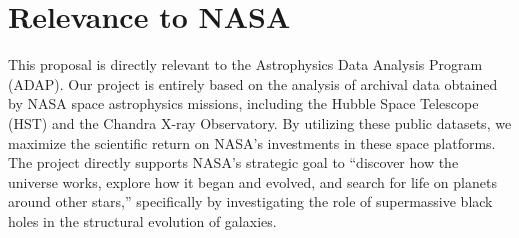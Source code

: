 \section{Relevance to NASA}
This proposal is directly relevant to the Astrophysics Data Analysis Program (ADAP). Our project is entirely based on the analysis of archival data obtained by NASA space astrophysics missions, including the Hubble Space Telescope (HST) and the Chandra X-ray Observatory. By utilizing these public datasets, we maximize the scientific return on NASA's investments in these space platforms. The project directly supports NASA's strategic goal to ``discover how the universe works, explore how it began and evolved, and search for life on planets around other stars,'' specifically by investigating the role of supermassive black holes in the structural evolution of galaxies.
